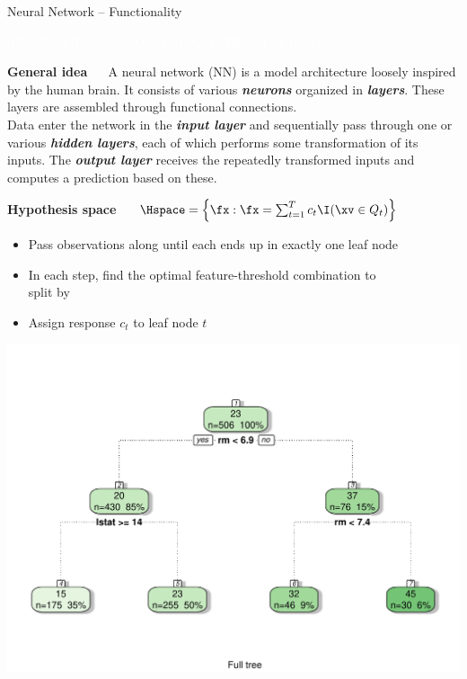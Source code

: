 \documentclass[11pt,compress,t,notes=noshow, xcolor=table]{beamer}
\newcommand{\bfit}[1]{\textbf{\textit{#1}}}
\newcommand{\maketag}[1]{\colorbox{highlightcol}{\textcolor{white}
{\MakeUppercase{#1}}}}
\newcommand{\highlight}[1]{\textcolor{highlightcol}{\textbf{#1}}}
\begin{document}
\begin{frame}{Neural Network -- Functionality}

\footnotesize

\maketag{|UN| SUPERVISED}
\maketag{|Non| parametric}
\maketag{BLACK-BOX}

\medskip

\highlight{General idea} ~~ A neural network (NN) is a model
architecture loosely inspired by the human brain. It consists of various
\bfit{neurons} organized in \bfit{layers}. These layers
are assembled through functional connections. 
\\ Data enter the network in
the \bfit{input layer} and sequentially pass through one or various
\bfit{hidden layers}, each of which performs some transformation of
its inputs. The \bfit{output layer} receives the repeatedly
transformed inputs and computes a prediction based on these.

\medskip
 
\highlight{Hypothesis space} ~~
$\Hspace = \left\{ \fx: \fx = \sum_{t = 1}^T c_t \I(\xv \in Q_t) 
\right\}$

\medskip

\begin{minipage}{0.6\textwidth}
  \begin{itemize}
    \item Pass observations along until each ends up in exactly 
    one leaf node
    \item In each step, find the optimal feature-threshold
    combination to \\ split by
  \item Assign response $c_t$ to leaf node $t$
\end{itemize}

\end{minipage}%
\begin{minipage}{0.4\textwidth}
  \includegraphics[width=\textwidth]{figure/cart.pdf}
\end{minipage}


\end{frame}
\end{document}
